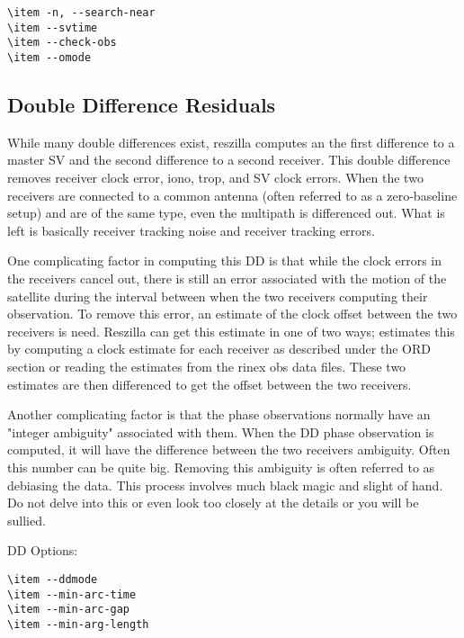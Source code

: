 \begin{verbatim}
\item -n, --search-near
\item --svtime
\item --check-obs
\item --omode
\end{verbatim}

\subsection{Double Difference Residuals}
While many double differences exist, reszilla computes an the first
difference to a master SV and the second difference to a second
receiver.  This double difference removes receiver clock error, iono,
trop, and SV clock errors. When the two receivers are connected to a
common antenna (often referred to as a zero-baseline setup) and are of
the same type, even the multipath is differenced out. What is left is
basically receiver tracking noise and receiver tracking errors.

One complicating factor in computing this DD is that while the clock
errors in the receivers cancel out, there is still an error associated
with the motion of the satellite during the interval between when the
two receivers computing their observation. To remove this error, an
estimate of the clock offset between the two receivers is
need. Reszilla can get this estimate in one of two ways; estimates
this by computing a clock estimate for each receiver as described
under the ORD section or reading the estimates from the rinex obs data
files. These two estimates are then differenced to get the offset
between the two receivers.

Another complicating factor is that the phase observations normally
have an "integer ambiguity" associated with them. When the DD phase
observation is computed, it will have the difference between the two
receivers ambiguity. Often this number can be quite big. Removing this
ambiguity is often referred to as debiasing the data. This process
involves much black magic and slight of hand. Do not delve into this
or even look too closely at the details or you will be sullied.

DD Options:

\begin{verbatim}
\item --ddmode
\item --min-arc-time
\item --min-arc-gap
\item --min-arg-length
\end{verbatim}

